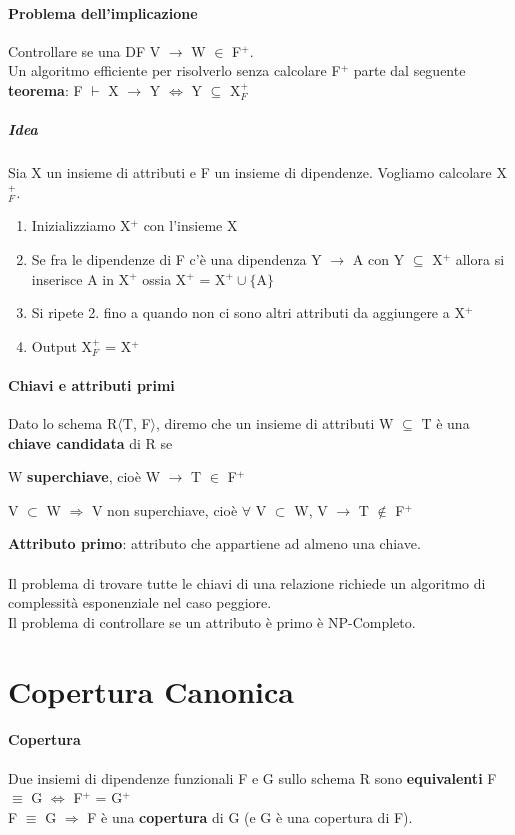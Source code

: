 \documentclass[10pt]{book}
\begin{document}
\paragraph{Problema dell'implicazione} Controllare se una DF V $\rightarrow$ W $\in$ F$^+$.\\
Un algoritmo efficiente per risolverlo senza calcolare F$^+$ parte dal seguente \textbf{teorema}: F $\vdash$ X $\rightarrow$ Y $\Leftrightarrow$ Y $\subseteq$ X$_F^+$
\subparagraph{Idea} Sia X un insieme di attributi e F un insieme di dipendenze. Vogliamo calcolare X$_F^+$.
\begin{enumerate}
	\item Inizializziamo X$^+$ con l'insieme X
	\item Se fra le dipendenze di F c'è una dipendenza Y $\rightarrow$ A con Y $\subseteq$ X$^+$ allora si inserisce A in X$^+$ ossia X$^+$ = X$^+\cup\{$A$\}$
	\item Si ripete 2. fino a quando non ci sono altri attributi da aggiungere a X$^+$
	\item Output X$_F^+$ = X$^+$
\end{enumerate}
\paragraph{Chiavi e attributi primi} Dato lo schema R$\langle$T, F$\rangle$, diremo che un insieme di attributi W $\subseteq$ T è una \textbf{chiave candidata} di R se
\begin{list}{}{}
	\item W \textbf{superchiave}, cioè W $\rightarrow$ T $\in$ F$^+$
	\item V $\subset$ W $\Rightarrow$ V non superchiave, cioè $\forall$ V $\subset$ W, V $\rightarrow$ T $\not\in$ F$^+$
\end{list}
\textbf{Attributo primo}: attributo che appartiene ad almeno una chiave.\\\\
Il problema di trovare tutte le chiavi di una relazione richiede un algoritmo di complessità esponenziale nel caso peggiore.\\
Il problema di controllare se un attributo è primo è NP-Completo.
\section{Copertura Canonica}
\paragraph{Copertura} Due insiemi di dipendenze funzionali F e G sullo schema R sono \textbf{equivalenti} F $\equiv$ G $\Leftrightarrow$ F$^+$ = G$^+$\\
F $\equiv$ G $\Rightarrow$ F è una \textbf{copertura} di G (e G è una copertura di F).
\end{document}

